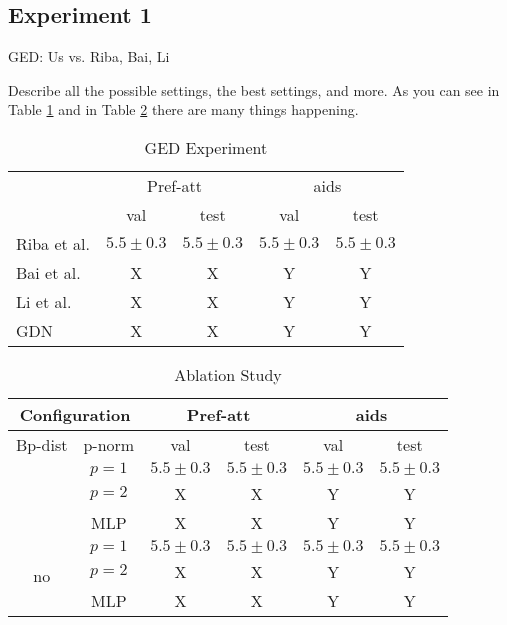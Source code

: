 \subsection{Experiment 1}

GED: Us vs. Riba, Bai, Li

Describe all the possible settings, the best settings, and more. As you can see in Table \ref{tab:ex1-baselines} and in Table \ref{tab:ex1-ablation} there are many things happening.


\begin{table}[htbp]
    \addtolength{\tabcolsep}{-1pt}
    \fontsize{9pt}{10.25pt}\selectfont
    \centering
    \renewcommand{\arraystretch}{1.2}
    \begin{tabular}{|l|c|c|c|c|}
        \hline
        \multirow{2}{*}{} & \multicolumn{2}{c|}{Pref-att} & \multicolumn{2}{c|}{aids} \\ \hhline{|~|-|-|-|-|}
        & val & test & val & test \\ \hhline{|=|=|=|=|=|}
        Riba et al. & $5.5 \pm 0.3$ & $5.5 \pm 0.3$ & $5.5 \pm 0.3$ & $5.5 \pm 0.3$ \\ \hline
        Bai et al. & X & X & Y & Y \\ \hline
        Li et al. & X & X & Y & Y \\ \hline
        GDN & X & X & Y & Y \\ \hline
    \end{tabular}
    \caption{GED Experiment}
    \label{tab:ex1-baselines}
\end{table}


\begin{table}[htbp]
    \addtolength{\tabcolsep}{-1pt}
    \fontsize{9pt}{10.25pt}\selectfont
    \centering
    \renewcommand{\arraystretch}{1.2}
    \begin{tabular}{|c|c|c|c|c|c|}
        \hline
        \multicolumn{2}{|c|}{Configuration} & \multicolumn{2}{c|}{Pref-att} & \multicolumn{2}{c|}{aids} \\ \hline
        Bp-dist & p-norm & val & test & val & test \\ \hhline{|=|=|=|=|=|=|}
        \multirow{3}{*}{yes} & $p=1$ & $5.5 \pm 0.3$ & $5.5 \pm 0.3$ & $5.5 \pm 0.3$ & $5.5 \pm 0.3$ \\ \hhline{|~|-|-|-|-|-|}
        & $p=2$ & X & X & Y & Y \\ \hhline{|~|-|-|-|-|-|}
        & MLP & X & X & Y & Y \\ \hline
        \multirow{3}{*}{no}  & $p=1$ & $5.5 \pm 0.3$ & $5.5 \pm 0.3$ & $5.5 \pm 0.3$ & $5.5 \pm 0.3$ \\ \hhline{|~|-|-|-|-|-|}
        & $p=2$ & X & X & Y & Y \\ \hhline{|~|-|-|-|-|-|}
        & MLP & X & X & Y & Y \\ \hline
    \end{tabular}
    \caption{Ablation Study}
    \label{tab:ex1-ablation}
\end{table}
